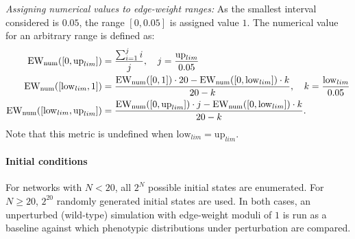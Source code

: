 \noindent\textit{Assigning numerical values to edge-weight ranges:} As the smallest interval considered is $0.05$, the range $[0, 0.05]$ is assigned value $1$. The numerical value for an arbitrary range is defined as:
\begin{align}
    \mathrm{EW_{num}}([0, \mathrm{up}_{lim}]) &= \frac{\sum_{i=1}^{j} i}{j}, \quad j = \frac{\mathrm{up}_{lim}}{0.05} \nonumber \\
    \mathrm{EW_{num}}([\mathrm{low}_{lim}, 1]) &= \frac{\mathrm{EW_{num}}([0,1]) \cdot 20 - \mathrm{EW_{num}}([0, \mathrm{low}_{lim}]) \cdot k}{20 - k}, \quad k = \frac{\mathrm{low}_{lim}}{0.05} \nonumber \\
    \mathrm{EW_{num}}([\mathrm{low}_{lim}, \mathrm{up}_{lim}]) &= \frac{\mathrm{EW_{num}}([0, \mathrm{up}_{lim}]) \cdot j - \mathrm{EW_{num}}([0, \mathrm{low}_{lim}]) \cdot k}{20 - k}. \label{eq:rw_ew}
\end{align}
Note that this metric is undefined when $\mathrm{low}_{lim} = \mathrm{up}_{lim}$.


\paragraph{Initial conditions} For networks with $N < 20$, all $2^N$ possible initial states are enumerated. For $N \geq 20$, $2^{20}$ randomly generated initial states are used. In both cases, an unperturbed (wild-type) simulation with edge-weight moduli of $1$ is run as a baseline against which phenotypic distributions under perturbation are compared.
